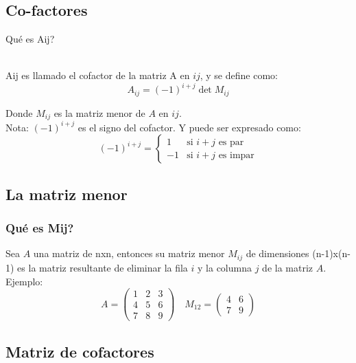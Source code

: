 \documentclass{beamer}
\begin{document}
    \subsection{Co-factores}

    \begin{frame}
        \begin{center}
            Qué es A{ij}?
        \end{center}\\
        A{ij} es llamado el cofactor de la matriz A en $ij$, y se define como:
        $$
        A_{ij} = (-1)^{i+j}\det{M_{ij}}
        $$

        Donde $M_{ij}$ es la matriz menor de $A$ en $ij$.\\
        Nota: $(-1)^{i+j}$ es el signo del cofactor. Y puede ser expresado como:
        $$
        (-1)^{i+j} =
        \begin{cases}
            1 & \text{si } i+j \text{ es par}\\
            -1 & \text{si } i+j \text{ es impar}
        \end{cases}
        $$
    \end{frame}

    \subsection{La matriz menor}

    \begin{frame}
        \frametitle{Qué es Mij?}
        Sea $A$ una matriz de nxn, entonces su matriz menor $M_{ij}$ de dimensiones (n-1)x(n-1) es la matriz resultante de eliminar la fila $i$ y la columna $j$ de la matriz $A$.\\
        Ejemplo:
        $$
        A =
        \begin{pmatrix}
            1 & 2 & 3 \\
            4 & 5 & 6 \\
            7 & 8 & 9
        \end{pmatrix}
        \quad M_{12} =
        \begin{pmatrix}
            4 & 6 \\
            7 & 9
        \end{pmatrix}
        $$
    \end{frame}

    \subsection{Matriz de cofactores}
\end{document}

